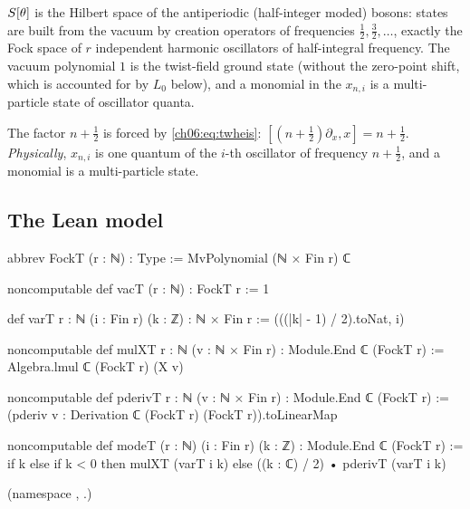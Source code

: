 \begin{physics}
$S[\theta]$ is the Hilbert space of the antiperiodic (half-integer moded) bosons: states are built from the vacuum by creation operators of frequencies $\tfrac12,\tfrac32,\ldots$, exactly the Fock space of $r$ independent harmonic oscillators of half-integral frequency. The vacuum polynomial $1$ is the twist-field ground state (without the zero-point shift, which is accounted for by $L_0$ below), and a monomial in the $x_{n,i}$ is a multi-particle state of oscillator quanta.
\end{physics}
The factor $n+\frac12$ is forced by \eqref{ch06:eq:twheis}: $[(n+\frac12)\partial_{x},x]=n+\frac12$.
\emph{Physically}, $x_{n,i}$ is one quantum of the $i$-th oscillator of frequency $n+\frac12$, and a
monomial is a multi-particle state.

\subsection{The Lean model}

\begin{leancode}
abbrev FockT (r : ℕ) : Type := MvPolynomial (ℕ × Fin r) ℂ
\end{leancode}
\begin{leancode}
noncomputable def vacT (r : ℕ) : FockT r := 1
\end{leancode}
\begin{leancode}
def varT {r : ℕ} (i : Fin r) (k : ℤ) : ℕ × Fin r := (((|k| - 1) / 2).toNat, i)
\end{leancode}
\begin{leancode}
noncomputable def mulXT {r : ℕ} (v : ℕ × Fin r) : Module.End ℂ (FockT r) :=
  Algebra.lmul ℂ (FockT r) (X v)
\end{leancode}
\begin{leancode}
noncomputable def pderivT {r : ℕ} (v : ℕ × Fin r) : Module.End ℂ (FockT r) :=
  (pderiv v : Derivation ℂ (FockT r) (FockT r)).toLinearMap
\end{leancode}
\begin{leancode}
noncomputable def modeT (r : ℕ) (i : Fin r) (k : ℤ) : Module.End ℂ (FockT r) :=
  if k %
  else if k < 0 then mulXT (varT i k)
  else ((k : ℂ) / 2) • pderivT (varT i k)
\end{leancode}
(namespace , .)

